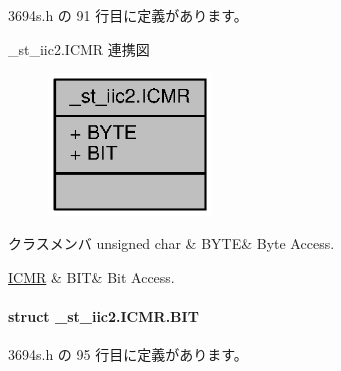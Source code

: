  3694s.\+h の 91 行目に定義があります。



\+\_\+st\+\_\+iic2.\+I\+C\+M\+R 連携図
\nopagebreak
\begin{figure}[H]
\begin{center}
\leavevmode
\includegraphics[width=123pt]{d1/dd5/union__st__iic2_8ICMR__coll__graph}
\end{center}
\end{figure}
\begin{DoxyFields}{クラスメンバ}
unsigned char\label{3694s_8h_ae409eb2ba6eb6801f52763ae370c350e}
&
B\+Y\+T\+E&
Byte Access. \\
\hline

\hyperlink{3694s_8h_d0/dbe/struct__st__iic2_8ICMR_8BIT}{I\+C\+M\+R}\label{3694s_8h_adb957fdc8000e1eef04a243f5199aa52}
&
B\+I\+T&
Bit Access. \\
\hline

\end{DoxyFields}
\label{struct__st__iic2_8ICMR_8BIT}
\paragraph{struct \+\_\+st\+\_\+iic2.\+I\+C\+M\+R.\+B\+I\+T}


 3694s.\+h の 95 行目に定義があります。



